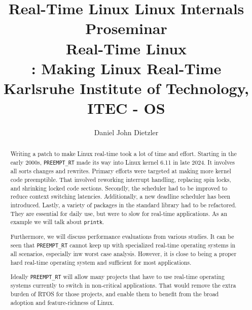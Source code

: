 \documentclass[10pt,twocolumn,a4paper]{article}
\begin{document}


\title{Real-Time Linux}

\title{%
{\normalfont \normalsize Linux Internals Proseminar}\\%
Real-Time Linux \\%
{\normalfont \normalsize {}: Making Linux Real-Time}\\%
{\normalfont \small
Karlsruhe Institute of Technology, ITEC - OS
}%
}

\author{Daniel John Dietzler}

\newcommand{\code}[1]{{\tt \small{#1}}}

\maketitle

\begin{abstract}
  Writing a patch to make Linux real-time took a lot of time and effort.
  Starting in the early 2000s, \code{PREEMPT\_RT} made its way into Linux kernel 6.11 in late 2024.
  It involves all sorts changes and rewrites.
  Primary efforts were targeted at making more kernel code preemptible.
  That involved reworking interrupt handling, replacing spin locks, and shrinking locked code sections.
  Secondly, the scheduler had to be improved to reduce context switching latencies.
  Additionally, a new deadline scheduler has been introduced.
  Lastly, a variety of packages in the standard library had to be refactored.
  They are essential for daily use, but were to slow for real-time applications.
  As an example we will talk about \code{printk}.

  Furthermore, we will discuss performance evaluations from various studies.
  It can be seen that \code{PREEMPT\_RT} cannot keep up with specialized real-time operating systems in all scenarios, especially inw worst case analysis.
  However, it is close to being a proper hard real-time operating system and sufficient for most applications.

  Ideally \code{PREEMPT\_RT} will allow many projects that have to use real-time operating systems currently to switch in non-critical applications.
  That would remove the extra burden of RTOS for those projects, and enable them to benefit from the broad adoption and feature-richness of Linux.
\end{abstract}
\end{document}
